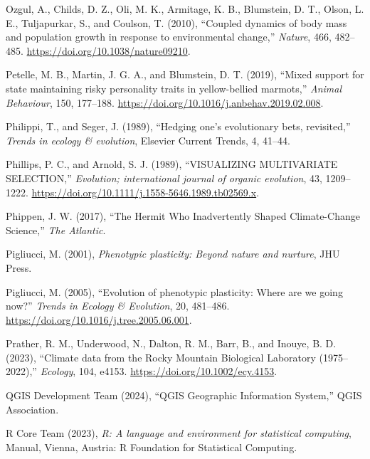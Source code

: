 \documentclass[
  12pt,
  letterpaper,
]{scrartcl}
\newlength{\cslhangindent}
\newenvironment{CSLReferences}[2] %
 {\begin{list}{}{%
  \setlength{\itemindent}{0pt}
  \setlength{\leftmargin}{0pt}
  \setlength{\parsep}{0pt}
  \ifodd #1
   \setlength{\leftmargin}{\cslhangindent}
   \setlength{\itemindent}{-1\cslhangindent}
  \fi
  \setlength{\itemsep}{#2\baselineskip}}}
 {\end{list}}
\begin{document}
\begin{CSLReferences}{1}{0}
Ozgul, A., Childs, D. Z., Oli, M. K., Armitage, K. B., Blumstein, D. T.,
Olson, L. E., Tuljapurkar, S., and Coulson, T. (2010), {``Coupled
dynamics of body mass and population growth in response to environmental
change,''} \emph{Nature}, 466, 482--485.
\url{https://doi.org/10.1038/nature09210}.

Petelle, M. B., Martin, J. G. A., and Blumstein, D. T. (2019), {``Mixed
support for state maintaining risky personality traits in yellow-bellied
marmots,''} \emph{Animal Behaviour}, 150, 177--188.
\url{https://doi.org/10.1016/j.anbehav.2019.02.008}.

Philippi, T., and Seger, J. (1989), {``Hedging one's evolutionary bets,
revisited,''} \emph{Trends in ecology \& evolution}, Elsevier Current
Trends, 4, 41--44.

Phillips, P. C., and Arnold, S. J. (1989), {``{VISUALIZING MULTIVARIATE
SELECTION},''} \emph{Evolution; international journal of organic
evolution}, 43, 1209--1222.
\url{https://doi.org/10.1111/j.1558-5646.1989.tb02569.x}.

Phippen, J. W. (2017), {``The {Hermit Who Inadvertently Shaped
Climate-Change Science},''} \emph{The Atlantic}.

Pigliucci, M. (2001), \emph{Phenotypic plasticity: {Beyond} nature and
nurture}, JHU Press.

Pigliucci, M. (2005), {``Evolution of phenotypic plasticity: {Where} are
we going now?''} \emph{Trends in Ecology \& Evolution}, 20, 481--486.
\url{https://doi.org/10.1016/j.tree.2005.06.001}.

Prather, R. M., Underwood, N., Dalton, R. M., Barr, B., and Inouye, B.
D. (2023), {``Climate data from the {Rocky Mountain Biological
Laboratory} (1975--2022),''} \emph{Ecology}, 104, e4153.
\url{https://doi.org/10.1002/ecy.4153}.

QGIS Development Team (2024), {``{QGIS Geographic Information
System},''} QGIS Association.

R Core Team (2023), \emph{R: A language and environment for statistical
computing}, Manual, Vienna, Austria: R Foundation for Statistical
Computing.


\end{CSLReferences}
\end{document}
